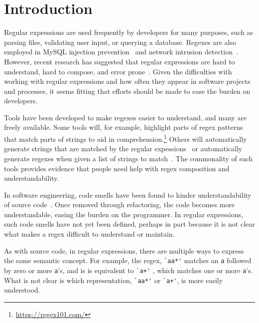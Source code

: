 \section{Introduction }

Regular expressions are used frequently by developers for many purposes, such as parsing files, validating user input, or querying a database.
Regexes are also employed in MySQL injection prevention~\cite{Yeole:2011:ADT:1980022.1980229} and network intrusion detection~\cite{network}. 
However, recent research has suggested that regular expressions  are hard to understand, hard to compose, and error prone~\cite{Spishak:2012:TSR:2318202.2318207}.
Given the difficulties with working with regular expressions and how often they appear in software projects and processes, it seems fitting that efforts should be made to ease the burden on developers.

Tools have been developed to make regexes easier to understand, and many are freely available.
Some tools will, for example, highlight parts of regex patterns that match parts of strings to aid in comprehension.\footnote{\url{https://regex101.com/}}
Others will automatically generate strings that are matched by the regular expessions~\cite{hampi} 
or  automatically generate regexes when given a list of strings to match~\cite{Babbar:2010:CBA:1871840.1871848, Li:2008:REL:1613715.1613719}.
The commonality of such tools provides evidence that people need help with regex composition and understandability.

In software engineering, code smells have been found to hinder understandability of source code~\cite{abbes2011empirical, du2006does}.
Once removed through refactoring, the code becomes more understandable, easing the burden on the programmer.
In regular expressions, such code smells have not yet been defined, perhaps in part because it is not clear what makes a regex difficult to understand or maintain. 

As with source code, in regular expressions, there are multiple ways to express the same semantic concept.
For example, the regex, \verb!`aa*'! matches an \verb!a! followed by zero or more \verb!a!'s, and is is equivalent to \verb!`a+'! , which matches one or more \verb!a!'s.
What is not clear is which representation,  \verb!`aa*'!  or  \verb!`a+'!, is more easily understood.

